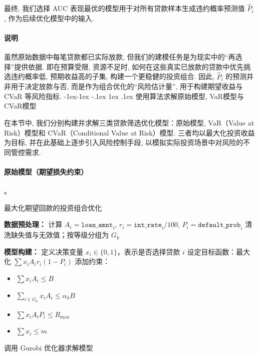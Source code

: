 \documentclass[12pt,nonblindrev]{write_paper}
\makeatletter
\renewcommand\subsection{\@startsection{subsection}{2}{\z@}%
                                     {-1ex\@plus -1ex \@minus -.1ex}%
                                     {1ex \@plus .1ex}%
                                     {\normalfont \normalsize \bfseries}}
\makeatother
\begin{document}
最终, 我们选择 AUC 表现最优的模型用于对所有贷款样本生成违约概率预测值 $\hat{P}_i$, 作为后续优化模型中的输入. 

\paragraph{说明}
虽然原始数据中每笔贷款都已实际放款, 但我们的建模任务是为现实中的“再选择”提供依据. 即在预算受限, 资源不足时, 如何在这些真实已放款的贷款中优先挑选违约概率低, 预期收益高的子集, 构建一个更稳健的投资组合. 因此, $\hat{P}_i$ 的预测并非用于决定放款与否, 而是作为组合优化的“风险估计量”, 用于构建期望收益与 CVaR 等风险指标. 
\subsection{使用算法求解原始模型, VaR模型与CVaR模型}
\label{subsec:model_solving}

在本节中, 我们分别构建并求解三类贷款筛选优化模型：原始模型, VaR（Value at Risk）模型和 CVaR（Conditional Value at Risk）模型. 三者均以最大化投资收益为目标, 并在此基础上逐步引入风险控制手段, 以模拟实际投资场景中对风险的不同管控需求. 

\vspace{1em}
\paragraph{原始模型（期望损失约束）}。

\begin{algorithm}[htbp]
\caption{最大化期望回款的投资组合优化}
\label{alg:max_profit}

\BlankLine
\textbf{数据预处理：} 计算 $A_i = \texttt{loan\_amnt}_i$, $r_i = \texttt{int\_rate}_i / 100$, $P_i = \texttt{default\_prob}_i$\;
清洗缺失值与无效值；按等级分组为 $G_k$\;

\BlankLine
\textbf{模型构建：}\;
定义决策变量 $x_i \in \{0,1\}$，表示是否选择贷款 $i$\;
设定目标函数：最大化 $\sum x_i A_i r_i(1 - P_i) $\;
添加约束：
\begin{itemize}
  \item $\sum x_i A_i \le B$ \hfill {}
  \item $\sum_{i \in G_k} x_i A_i \le \alpha_k B$ \hfill {}
  \item $\sum x_i A_i P_i \le R_{\max}$ \hfill {}
  \item $\sum x_i \le m$ \hfill {}
\end{itemize}

\BlankLine
调用 Gurobi 优化器求解模型\;

\end{algorithm}
\end{document}
